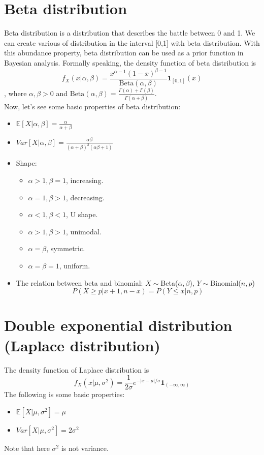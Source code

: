 \documentclass[../Distributions.tex]{subfiles}
\begin{document}
\section{Beta distribution}
Beta distribution is a distribution that describes the battle between 0 and 1. We can create various of distribution in the interval [0,1] with beta distribution. With this abundance property, beta distribution can be used as a prior function in Bayesian analysis. Formally speaking, the density function of beta distribution is
$$f_X(x|\alpha,\beta) = \frac{x^{\alpha-1}(1-x)^{\beta-1}}{\mbox{Beta}(\alpha,\beta)}\mathbf{1}_{[0,1]}(x)$$
, where $\alpha,\beta>0$ and $\mbox{Beta}(\alpha,\beta) = \frac{\Gamma(\alpha)+\Gamma(\beta)}{\Gamma(\alpha+\beta)}$.\\
Now, let's see some basic properties of beta distribution:
\begin{itemize}
	\item $\mathbb{E}[X|\alpha,\beta] = \frac{\alpha}{\alpha+\beta}$
	\item $Var[X|\alpha,\beta] = \frac{\alpha\beta}{(\alpha+\beta)^2(\alpha\beta+1)}$
	\item Shape:
	\begin{itemize}
		\item $\alpha>1,\beta=1$, increasing.
		\item $\alpha=1, \beta > 1$, decreasing.
		\item $\alpha<1,\beta<1$, U shape.
		\item $\alpha>1,\beta>1$, unimodal.
		\item $\alpha=\beta$, symmetric.
		\item $\alpha=\beta=1$, uniform.
	\end{itemize}
	\item The relation between beta and binomial: $X\sim$Beta($\alpha,\beta$), $Y\sim$Binomial($n,p$)
	$$P(X\geq p|x+1,n-x) = P(Y\leq x|n,p)$$
\end{itemize}

\section{Double exponential distribution (Laplace distribution)}
The density function of Laplace distribution is
$$f_X(x|\mu,\sigma^2) = \frac{1}{2\sigma}e^{-|x-\mu|/\sigma}\mathbf{1}_{(-\infty,\infty)}$$
The following is some basic properties:
\begin{itemize}
	\item $\mathbb{E}[X|\mu,\sigma^2] = \mu$
	\item $Var[X|\mu,\sigma^2] = 2\sigma^2$
\end{itemize}
Note that here $\sigma^2$ is not variance.
\end{document}

